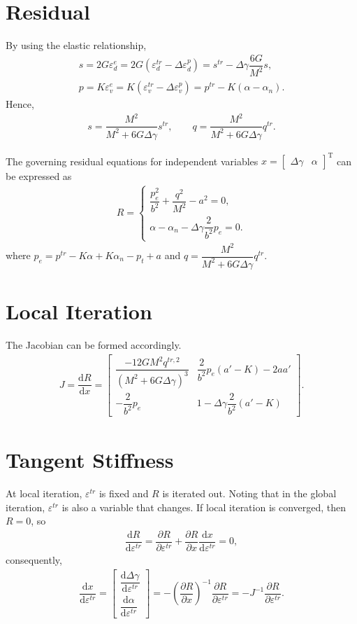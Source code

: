\documentclass[10pt,fleqn,3p]{elsarticle}
\newcommand*{\md}[1]{\mathrm{d}#1}
\newcommand*{\ddfrac}[2]{\dfrac{\md#1}{\md#2}}
\newcommand*{\pfrac}[2]{\dfrac{\partial#1}{\partial#2}}
\begin{document}
\section{Residual}
By using the elastic relationship,
\begin{gather}
s=2G\varepsilon^e_d=2G\left(\varepsilon^{tr}_d-\Delta\varepsilon^p_d\right)=s^{tr}-\Delta\gamma\dfrac{6G}{M^2}s,\\
p=K\varepsilon^e_v=K\left(\varepsilon^{tr}_v-\Delta\varepsilon^p_v\right)=p^{tr}-K\left(\alpha-\alpha_n\right).
\end{gather}
Hence,
\begin{gather}
s=\dfrac{M^2}{M^2+6G\Delta\gamma}s^{tr},\qquad
q=\dfrac{M^2}{M^2+6G\Delta\gamma}q^{tr}.
\end{gather}

The governing residual equations for independent variables $x=\begin{bmatrix}\Delta\gamma&\alpha\end{bmatrix}^\mathrm{T}$ can be expressed as
\begin{gather}
R=\left\{\begin{array}{l}
\dfrac{p_e^2}{b^2}+\dfrac{q^2}{M^2}-a^2=0,\\[4mm]
\alpha-\alpha_n-\Delta\gamma\dfrac{2}{b^2}p_e=0.
\end{array}\right.
\end{gather}
where $p_e=p^{tr}-K\alpha+K\alpha_n-p_t+a$ and $q=\dfrac{M^2}{M^2+6G\Delta\gamma}q^{tr}$.
\section{Local Iteration}
The Jacobian can be formed accordingly.
\begin{gather}
J=\ddfrac{R}{x}=\begin{bmatrix}
\dfrac{-12GM^2q^{tr,2}}{(M^2+6G\Delta\gamma)^3}&\dfrac{2}{b^2}p_e(a'-K)-2aa'\\[4mm]
-\dfrac{2}{b^2}p_e&1-\Delta\gamma\dfrac{2}{b^2}(a'-K)
\end{bmatrix}.
\end{gather}
\section{Tangent Stiffness}
At local iteration, $\varepsilon^{tr}$ is fixed and $R$ is iterated out. Noting that in the global iteration, $\varepsilon^{tr}$ is also a variable that changes. If local iteration is converged, then $R=0$, so
\begin{gather}
\ddfrac{R}{\varepsilon^{tr}}=\pfrac{R}{\varepsilon^{tr}}+\pfrac{R}{x}\ddfrac{x}{\varepsilon^{tr}}=0,
\end{gather}
consequently,
\begin{gather}
\ddfrac{x}{\varepsilon^{tr}}=
\begin{bmatrix}
\ddfrac{\Delta\gamma}{\varepsilon^{tr}}\\[4mm]\ddfrac{\alpha}{\varepsilon^{tr}}
\end{bmatrix}
=-\left(\pfrac{R}{x}\right)^{-1}\pfrac{R}{\varepsilon^{tr}}=-J^{-1}\pfrac{R}{\varepsilon^{tr}}.
\end{gather}
\end{document}
